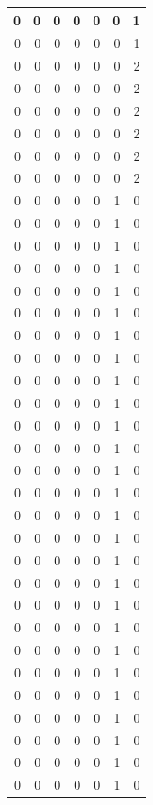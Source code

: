 \documentclass[
  12pt,
]{krantz}
\begin{document}
\begin{tabular}{r|r|r|r|r|r|r}
\hline
0 & 0 & 0 & 0 & 0 & 0 & 1\\
\hline
0 & 0 & 0 & 0 & 0 & 0 & 1\\
\hline
0 & 0 & 0 & 0 & 0 & 0 & 2\\
\hline
0 & 0 & 0 & 0 & 0 & 0 & 2\\
\hline
0 & 0 & 0 & 0 & 0 & 0 & 2\\
\hline
0 & 0 & 0 & 0 & 0 & 0 & 2\\
\hline
0 & 0 & 0 & 0 & 0 & 0 & 2\\
\hline
0 & 0 & 0 & 0 & 0 & 0 & 2\\
\hline
0 & 0 & 0 & 0 & 0 & 1 & 0\\
\hline
0 & 0 & 0 & 0 & 0 & 1 & 0\\
\hline
0 & 0 & 0 & 0 & 0 & 1 & 0\\
\hline
0 & 0 & 0 & 0 & 0 & 1 & 0\\
\hline
0 & 0 & 0 & 0 & 0 & 1 & 0\\
\hline
0 & 0 & 0 & 0 & 0 & 1 & 0\\
\hline
0 & 0 & 0 & 0 & 0 & 1 & 0\\
\hline
0 & 0 & 0 & 0 & 0 & 1 & 0\\
\hline
0 & 0 & 0 & 0 & 0 & 1 & 0\\
\hline
0 & 0 & 0 & 0 & 0 & 1 & 0\\
\hline
0 & 0 & 0 & 0 & 0 & 1 & 0\\
\hline
0 & 0 & 0 & 0 & 0 & 1 & 0\\
\hline
0 & 0 & 0 & 0 & 0 & 1 & 0\\
\hline
0 & 0 & 0 & 0 & 0 & 1 & 0\\
\hline
0 & 0 & 0 & 0 & 0 & 1 & 0\\
\hline
0 & 0 & 0 & 0 & 0 & 1 & 0\\
\hline
0 & 0 & 0 & 0 & 0 & 1 & 0\\
\hline
0 & 0 & 0 & 0 & 0 & 1 & 0\\
\hline
0 & 0 & 0 & 0 & 0 & 1 & 0\\
\hline
0 & 0 & 0 & 0 & 0 & 1 & 0\\
\hline
0 & 0 & 0 & 0 & 0 & 1 & 0\\
\hline
0 & 0 & 0 & 0 & 0 & 1 & 0\\
\hline
0 & 0 & 0 & 0 & 0 & 1 & 0\\
\hline
0 & 0 & 0 & 0 & 0 & 1 & 0\\
\hline
0 & 0 & 0 & 0 & 0 & 1 & 0\\
\hline
0 & 0 & 0 & 0 & 0 & 1 & 0\\
\hline
0 & 0 & 0 & 0 & 0 & 1 & 0\\

\end{tabular}
\end{document}
